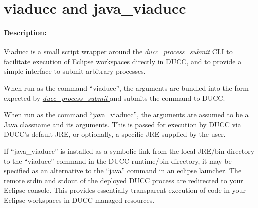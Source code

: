 % 
% 
% 
% 
\ifpdf
\else
{}
\fi
    \section{viaducc and java\_viaducc}
    \label{sec:cli.viaducc}

    \paragraph{Description:}
        Viaducc is a small script wrapper around the \hyperref[sec:cli.ducc-process-submit]{\em
          ducc\_process\_submit } CLI to facilitate execution of Eclipse workspaces directly in DUCC,
        and to provide a simple interface to submit arbitrary processes.

        When run as the command ``viaducc'', the arguments are bundled into the form expected by
        \hyperref[sec:cli.ducc-process-submit]{\em ducc\_process\_submit } and submits the command
        to DUCC.

        When run as the command ``java\_viaducc'', the arguments are assumed to be a Java classname
        and its arguments.  This is passed for execution by DUCC via DUCC's default JRE, or
        optionally, a specific JRE supplied by the user.

        If ``java\_viaducc'' is installed as a symbolic link from the local JRE/bin directory to the
        ``viaducc'' command in the DUCC runtime/bin directory, it may be specified as an alternative
        to the ``java'' command in an eclipse launcher.  The remote stdin and stdout of the deployed
        DUCC process are redirected to your Eclipse console.  This provides essentially transparent
        execution of code in your Eclipse workspaces in DUCC-managed resources.

